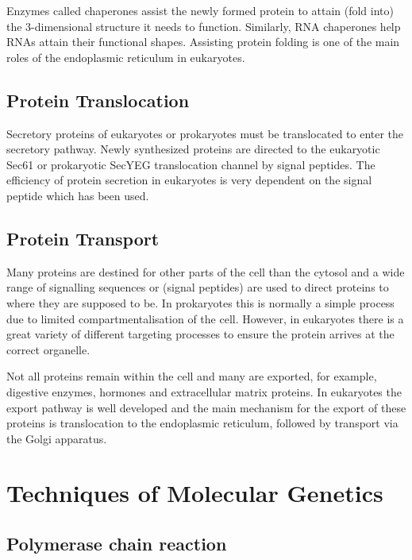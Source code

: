 Enzymes called chaperones assist the newly formed protein to attain (fold into) the 3-dimensional structure it needs to function. Similarly, RNA chaperones help RNAs attain their functional shapes. Assisting protein folding is one of the main roles of the endoplasmic reticulum in eukaryotes.

\hypertarget{protein-translocation}{%
\subsection{Protein Translocation}\label{protein-translocation}}

Secretory proteins of eukaryotes or prokaryotes must be translocated to enter the secretory pathway. Newly synthesized proteins are directed to the eukaryotic Sec61 or prokaryotic SecYEG translocation channel by signal peptides. The efficiency of protein secretion in eukaryotes is very dependent on the signal peptide which has been used.

\hypertarget{protein-transport}{%
\subsection{Protein Transport}\label{protein-transport}}

Many proteins are destined for other parts of the cell than the cytosol and a wide range of signalling sequences or (signal peptides) are used to direct proteins to where they are supposed to be. In prokaryotes this is normally a simple process due to limited compartmentalisation of the cell. However, in eukaryotes there is a great variety of different targeting processes to ensure the protein arrives at the correct organelle.

Not all proteins remain within the cell and many are exported, for example, digestive enzymes, hormones and extracellular matrix proteins. In eukaryotes the export pathway is well developed and the main mechanism for the export of these proteins is translocation to the endoplasmic reticulum, followed by transport via the Golgi apparatus.

\hypertarget{techniques-of-molecular-genetics}{%
\section{Techniques of Molecular Genetics}\label{techniques-of-molecular-genetics}}

\hypertarget{polymerase-chain-reaction}{%
\subsection{Polymerase chain reaction}\label{polymerase-chain-reaction}}

